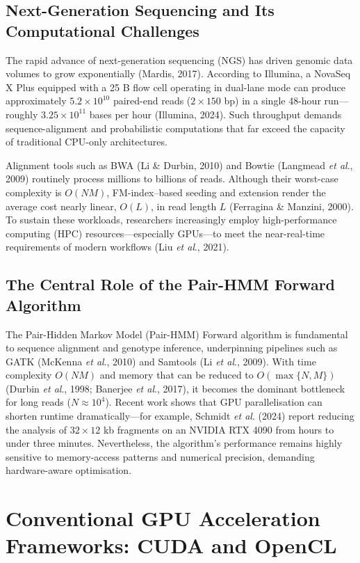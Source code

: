 \documentclass[PhD]{PHlab-thesis}
\begin{document}
\subsection{Next-Generation Sequencing and Its Computational Challenges}
The rapid advance of next-generation sequencing (NGS) has driven genomic data volumes to grow exponentially (Mardis, 2017). According to Illumina, a NovaSeq X Plus equipped with a 25 B flow cell operating in dual-lane mode can produce approximately $5.2\times10^{10}$ paired-end reads ($2\times150$ bp) in a single 48-hour run—roughly $3.25\times10^{11}$ bases per hour (Illumina, 2024). Such throughput demands sequence-alignment and probabilistic computations that far exceed the capacity of traditional CPU-only architectures.

Alignment tools such as BWA (Li \& Durbin, 2010) and Bowtie (Langmead \emph{et al}., 2009) routinely process millions to billions of reads. Although their worst-case complexity is $O(NM)$, FM-index–based seeding and extension render the average cost nearly linear, $O(L)$, in read length $L$ (Ferragina \& Manzini, 2000). To sustain these workloads, researchers increasingly employ high-performance computing (HPC) resources—especially GPUs—to meet the near-real-time requirements of modern workflows (Liu \emph{et al}., 2021).

\subsection{The Central Role of the Pair-HMM Forward Algorithm}
The Pair-Hidden Markov Model (Pair-HMM) Forward algorithm is fundamental to sequence alignment and genotype inference, underpinning pipelines such as GATK (McKenna \emph{et al}., 2010) and Samtools (Li \emph{et al}., 2009). With time complexity $O(NM)$ and memory that can be reduced to $O(\max\{N,M\})$ (Durbin \emph{et al}., 1998; Banerjee \emph{et al}., 2017), it becomes the dominant bottleneck for long reads ($N\approx10^{4}$). Recent work shows that GPU parallelisation can shorten runtime dramatically—for example, Schmidt \emph{et al}. (2024) report reducing the analysis of $32\times12$ kb fragments on an NVIDIA RTX 4090 from hours to under three minutes. Nevertheless, the algorithm's performance remains highly sensitive to memory-access patterns and numerical precision, demanding hardware-aware optimisation.

\section{Conventional GPU Acceleration Frameworks: CUDA and OpenCL}
\end{document}
